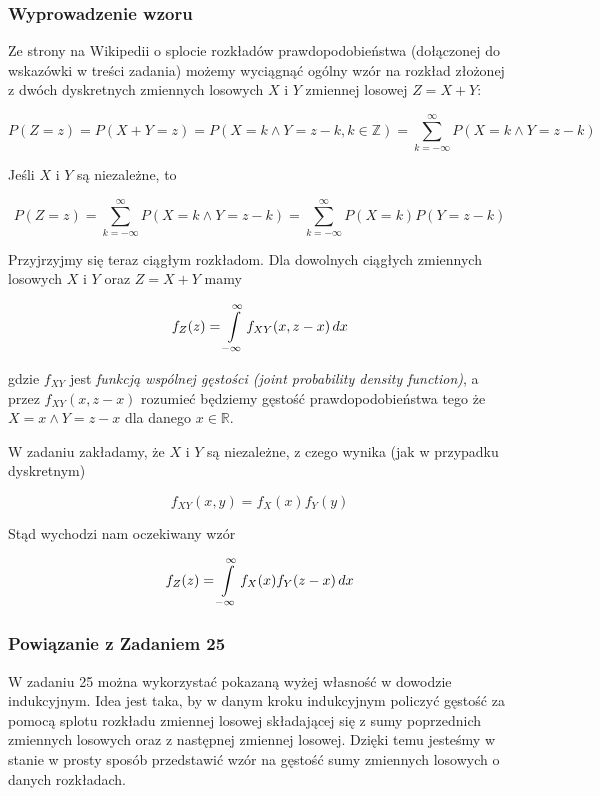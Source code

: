 \documentclass{article}
\begin{document}
    \subsubsection{Wyprowadzenie wzoru}

    Ze strony na Wikipedii o splocie rozkładów prawdopodobieństwa (dołączonej do wskazówki w treści zadania) możemy wyciągnąć ogólny wzór na rozkład złożonej z dwóch
    dyskretnych zmiennych losowych $X$ i $Y$ zmiennej losowej $Z = X + Y$:

    \begin{equation}
        P(Z=z) = P(X+Y=z) = P(X=k \land Y=z-k , k\in \mathbb{Z}) = \sum_{k=-\infty}^{\infty}{P(X=k \land Y=z-k)}
    \end{equation}

    Jeśli $X$ i $Y$ są niezależne, to

    \begin{equation}
        P(Z=z) = \sum_{k=-\infty}^{\infty}{P(X=k \land Y=z-k)} = \sum_{k=-\infty}^{\infty}{P(X=k)P(Y=z-k)}
    \end{equation}

    Przyjrzyjmy się teraz ciągłym rozkładom. Dla dowolnych ciągłych zmiennych losowych $X$ i $Y$ oraz $Z = X + Y$ mamy

    \begin{equation}
        f_Z(z) = \int\displaylimits_{-\infty}^{\infty} f_{XY}(x,z-x) \,dx 
    \end{equation}

    gdzie $f_{XY}$ jest \textit{funkcją wspólnej gęstości (joint probability density function)}, a przez $f_{XY}(x,z-x)$ rozumieć będziemy
    gęstość prawdopodobieństwa tego że $X=x \land Y=z-x$ dla danego $x\in \mathbb{R}$. 

    W zadaniu zakładamy, że $X$ i $Y$ są niezależne, z czego wynika (jak w przypadku dyskretnym)

    \begin{equation}
        f_{XY}(x,y)=f_X(x)f_Y(y)
    \end{equation}

    Stąd wychodzi nam oczekiwany wzór

    \begin{equation}
        f_Z(z) = \int\displaylimits_{-\infty}^{\infty} f_X(x)f_Y(z-x) \,dx 
    \end{equation}


    \subsubsection{Powiązanie z Zadaniem 25}

    W zadaniu 25 można wykorzystać pokazaną wyżej własność w dowodzie indukcyjnym. Idea jest taka, by w danym kroku indukcyjnym 
    policzyć gęstość za pomocą splotu rozkładu zmiennej losowej składającej się z sumy poprzednich zmiennych losowych oraz z następnej zmiennej losowej.
    Dzięki temu jesteśmy w stanie w prosty sposób przedstawić wzór na gęstość sumy zmiennych losowych o danych rozkładach. 

    
\end{document}
